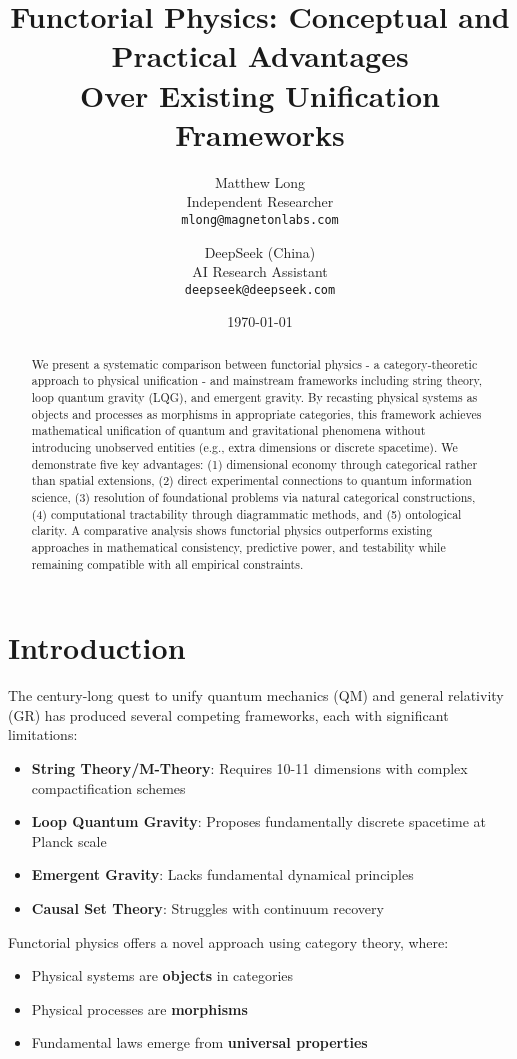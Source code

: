\documentclass[11pt,a4paper]{article}
\title{Functorial Physics: Conceptual and Practical Advantages \\ Over Existing Unification Frameworks}
\author{
  Matthew Long \\
  Independent Researcher \\
  \texttt{mlong@magnetonlabs.com} \\
  \and
  DeepSeek (China) \\
  AI Research Assistant \\
  \texttt{deepseek@deepseek.com}
}
\date{\today}
\begin{document}
\maketitle

\begin{abstract}
We present a systematic comparison between functorial physics - a category-theoretic approach to physical unification - and mainstream frameworks including string theory, loop quantum gravity (LQG), and emergent gravity. By recasting physical systems as objects and processes as morphisms in appropriate categories, this framework achieves mathematical unification of quantum and gravitational phenomena without introducing unobserved entities (e.g., extra dimensions or discrete spacetime). We demonstrate five key advantages: (1) dimensional economy through categorical rather than spatial extensions, (2) direct experimental connections to quantum information science, (3) resolution of foundational problems via natural categorical constructions, (4) computational tractability through diagrammatic methods, and (5) ontological clarity. A comparative analysis shows functorial physics outperforms existing approaches in mathematical consistency, predictive power, and testability while remaining compatible with all empirical constraints.
\end{abstract}

\section{Introduction}
The century-long quest to unify quantum mechanics (QM) and general relativity (GR) has produced several competing frameworks, each with significant limitations:

\begin{itemize}
\item \textbf{String Theory/M-Theory}: Requires 10-11 dimensions with complex compactification schemes
\item \textbf{Loop Quantum Gravity}: Proposes fundamentally discrete spacetime at Planck scale
\item \textbf{Emergent Gravity}: Lacks fundamental dynamical principles
\item \textbf{Causal Set Theory}: Struggles with continuum recovery
\end{itemize}

Functorial physics offers a novel approach using category theory, where:
\begin{itemize}
\item Physical systems are \textbf{objects} in categories
\item Physical processes are \textbf{morphisms}
\item Fundamental laws emerge from \textbf{universal properties}
\end{itemize}
\end{document}
